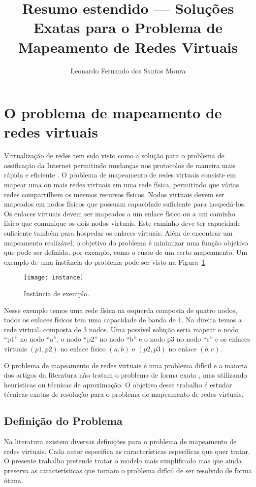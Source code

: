 \documentclass[10pt, a4paper]{article}
\title{Resumo estendido --- Soluções Exatas para o Problema de Mapeamento de Redes Virtuais}
\author{Leonardo Fernando dos Santos Moura}
\begin{document}
\maketitle

\section{O problema de mapeamento de redes virtuais}
Virtualização de redes tem sido visto como a solução para o problema de ossificação da Internet permitindo mudanças nos protocolos de maneira mais rápida e eficiente \cite{Feamster:2007}. O problema de mapeamento de redes virtuais consiste em mapear uma ou mais redes virtuais em uma rede física, permitindo que várias redes compartilhem os mesmos recursos físicos. Nodos virtuais devem ser mapeados em nodos físicos que possuam capacidade suficiente para hospedá-los. Os enlaces virtuais devem ser mapeados a um enlace físico ou a um caminho físico que comunique os dois nodos virtuais. Este caminho deve ter capacidade suficiente também para hospedar os enlaces virtuais. Além de encontrar um mapeamento realizável, o objetivo do problema é minimizar uma função objetivo que pode ser definida, por exemplo, como o custo de um certo mapeamento. Um exemplo de uma instância do problema pode ser visto na Figura~\ref{fig:instance}.

\begin{figure}[h]
  {\centering
    	\texttt{[image: instance]}
	    \center\caption{Instância de exemplo.}
    	\label{fig:instance}
    }
\end{figure}

Nesse exemplo temos uma rede física na esquerda composta de quatro nodos, todos os enlaces físicos tem uma capacidade de banda de 1. Na direita temos a rede virtual, composta de 3 nodos. Uma possível solução seria mapear o nodo ``p1'' no nodo ``a'', o nodo ``p2'' no nodo ``b'' e o nodo p3 no nodo ``c'' e os enlaces virtuais $(p1,p2)$ no enlace físico $(a,b)$ e $(p2,p3)$ no enlace $(b,c)$.

O problema de mapeamento de redes virtuais é uma problema difícil e a maioria dos artigos da literatura não tratam o problema de forma exata \cite{Chowdhury2010}, mas utilizando heurísticas ou técnicas de aproximação. O objetivo desse trabalho é estudar técnicas exatas de resolução para o problema de mapeamento de redes virtuais.

\subsection{Definição do Problema}
Na literatura existem diversas definições para o problema de mapeamento de redes virtuais. Cada autor especifica as características específicas que quer tratar. O presente trabalho pretende tratar o modelo mais simplificado mas que ainda preserva as características que tornam o problema difícil de ser resolvido de forma ótima.
\end{document}
